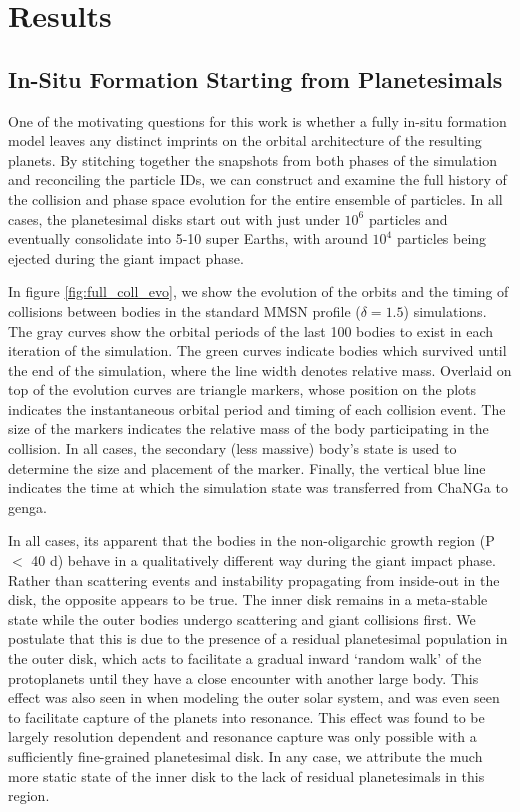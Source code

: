\section{Results} \label{sec:results}

\subsection{In-Situ Formation Starting from Planetesimals}

One of the motivating questions for this work is whether a fully in-situ formation model leaves any distinct imprints on the orbital architecture of the resulting planets. By stitching together the snapshots from both phases of the simulation and reconciling the particle IDs, we can construct and examine the full history of the collision and phase space evolution for the entire ensemble of particles. In all cases, the planetesimal disks start out with just under $10^{6}$ particles and eventually consolidate into 5-10 super Earths, with around $10^{4}$ particles being ejected during the giant impact phase.

In figure \ref{fig:full_coll_evo}, we show the evolution of the orbits and the timing of collisions between bodies in the standard MMSN profile ($\delta = 1.5$) simulations. The gray curves show the orbital periods of the last 100 bodies to exist in each iteration of the simulation. The green curves indicate bodies which survived until the end of the simulation, where the line width denotes relative mass. Overlaid on top of the evolution curves are triangle markers, whose position on the plots indicates the instantaneous orbital period and timing of each collision event. The size of the markers indicates the relative mass of the body participating in the collision. In all cases, the secondary (less massive) body's state is used to determine the size and placement of the marker. Finally, the vertical blue line indicates the time at which the simulation state was transferred from {\sc ChaNGa} to {\sc genga}.

In all cases, its apparent that the bodies in the non-oligarchic growth region (P $<$ 40 d) behave in a qualitatively different way during the giant impact phase. Rather than scattering events and instability propagating from inside-out in the disk, the opposite appears to be true. The inner disk remains in a meta-stable state while the outer bodies undergo scattering and giant collisions first. We postulate that this is due to the presence of a residual planetesimal population in the outer disk, which acts to facilitate a gradual inward `random walk' of the protoplanets until they have a close encounter with another large body. This effect was also seen in \cite{murrayclay06} when modeling the outer solar system, and was even seen to facilitate capture of the planets into resonance. This effect was found to be largely resolution dependent and resonance capture was only possible with a sufficiently fine-grained planetesimal disk. In any case, we attribute the much more static state of the inner disk to the lack of residual planetesimals in this region.

